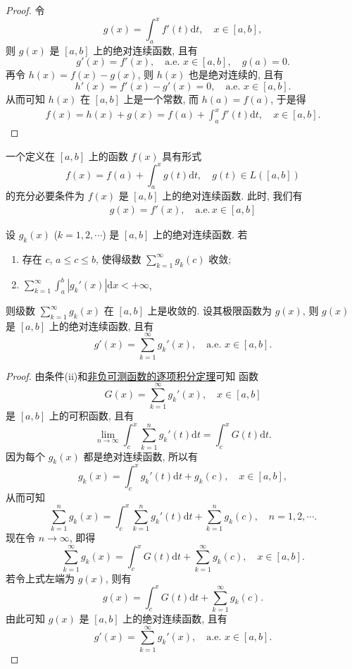 \documentclass[../../main.tex]{subfiles}%
\begin{document}
\begin{proof}

令
\[
g(x) = \int_a^x f'(t)\mathrm{d}t,\quad x\in[a,b],
\]
则 $g(x)$ 是 $[a,b]$ 上的绝对连续函数, 且有
\[
g'(x) = f'(x),\quad \text{a.e. } x\in[a,b],\quad g(a)=0.
\]
再令 $h(x)=f(x)-g(x)$, 则 $h(x)$ 也是绝对连续的, 且有
\[
h'(x) = f'(x)-g'(x) = 0,\quad \text{a.e. } x\in[a,b].
\]
从而可知 $h(x)$ 在 $[a,b]$ 上是一个常数, 而 $h(a)=f(a)$, 于是得
\begin{align*}
f(x) = h(x)+g(x) 
= f(a) + \int_a^x f'(t)\mathrm{d}t,\quad x\in[a,b].
\end{align*}

\end{proof}

\begin{corollary}[Lebesgue微积分基本定理]\label{corollary:Lebesgue微积分基本定理}
一个定义在 $[a,b]$ 上的函数 $f(x)$ 具有形式
\[
f(x) = f(a) + \int_a^x g(t)\mathrm{d}t,\quad g(t)\in L([a,b])
\]
的充分必要条件为 $f(x)$ 是 $[a,b]$ 上的绝对连续函数. 此时, 我们有
\begin{align*}
g(x)=f' (x),\quad \mathrm{a}.\mathrm{e}.\,x\in [a,b]
\end{align*}
\end{corollary}

\begin{proposition}
设 $g_k(x)$ ($k=1,2,\cdots$) 是 $[a,b]$ 上的绝对连续函数. 若
\begin{enumerate}[(1)]
\item 存在 $c$, $a\leqslant c\leqslant b$, 使得级数 $\sum_{k=1}^\infty g_k(c)$ 收敛;
\item $\sum_{k=1}^\infty \int_a^b |g_k'(x)|\mathrm{d}x < +\infty$,
\end{enumerate}
则级数 $\sum_{k=1}^\infty g_k(x)$ 在 $[a,b]$ 上是收敛的. 设其极限函数为 $g(x)$, 则 $g(x)$ 是 $[a,b]$ 上的绝对连续函数, 且有
\[
g'(x) = \sum_{k=1}^\infty g_k'(x),\quad \text{a.e. } x\in[a,b].
\]
\end{proposition}
\begin{proof}

由条件(ii)和\hyperref[theorem:非负可测函数的逐项积分定理]{非负可测函数的逐项积分定理}可知 函数
\[
G(x) = \sum_{k=1}^\infty g_k'(x),\quad x\in[a,b]
\]
是 $[a,b]$ 上的可积函数, 且有
\[
\lim_{n\to\infty} \int_c^x \sum_{k=1}^n g_k'(t)\mathrm{d}t = \int_c^x G(t)\mathrm{d}t.
\]
因为每个 $g_k(x)$ 都是绝对连续函数, 所以有
\[
g_k(x) = \int_c^x g_k'(t)\mathrm{d}t + g_k(c),\quad x\in[a,b],
\]
从而可知
\[
\sum_{k=1}^n g_k(x) = \int_c^x \sum_{k=1}^n g_k'(t)\mathrm{d}t + \sum_{k=1}^n g_k(c),\quad n=1,2,\cdots.
\]
现在令 $n\to\infty$, 即得
\[
\sum_{k=1}^\infty g_k(x) = \int_c^x G(t)\mathrm{d}t + \sum_{k=1}^\infty g_k(c),\quad x\in[a,b].
\]
若令上式左端为 $g(x)$, 则有
\[
g(x) = \int_c^x G(t)\mathrm{d}t + \sum_{k=1}^\infty g_k(c).
\]
由此可知 $g(x)$ 是 $[a,b]$ 上的绝对连续函数, 且有
\[
g'(x) = \sum_{k=1}^\infty g_k'(x),\quad \text{a.e. } x\in[a,b].
\]

\end{proof}
\end{document}
